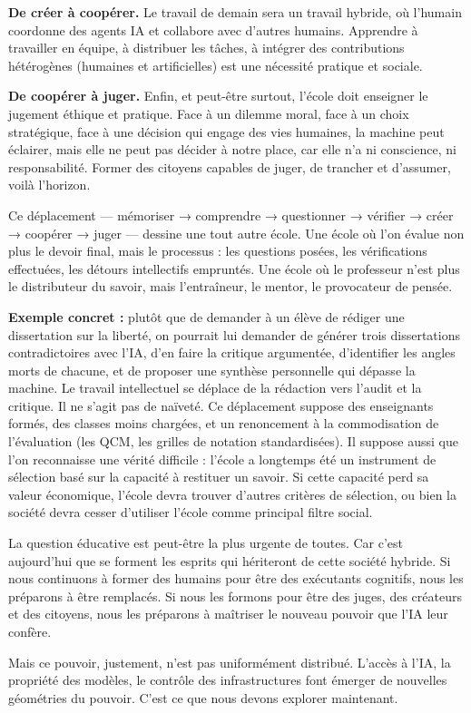 \textbf{De créer à coopérer.} Le travail de demain sera un travail hybride, où l'humain coordonne des agents IA et collabore avec d'autres humains. Apprendre à travailler en équipe, à distribuer les tâches, à intégrer des contributions hétérogènes (humaines et artificielles) est une nécessité pratique et sociale.

\textbf{De coopérer à juger.} Enfin, et peut-être surtout, l'école doit enseigner le jugement éthique et pratique. Face à un dilemme moral, face à un choix stratégique, face à une décision qui engage des vies humaines, la machine peut éclairer, mais elle ne peut pas décider à notre place, car elle n'a ni conscience, ni responsabilité. Former des citoyens capables de juger, de trancher et d'assumer, voilà l'horizon.

Ce déplacement — mémoriser → comprendre → questionner → vérifier → créer → coopérer → juger — dessine une tout autre école. Une école où l'on évalue non plus le devoir final, mais le processus : les questions posées, les vérifications effectuées, les détours intellectifs empruntés. Une école où le professeur n'est plus le distributeur du savoir, mais l'entraîneur, le mentor, le provocateur de pensée.

\textbf{Exemple concret :} plutôt que de demander à un élève de rédiger une dissertation sur la liberté, on pourrait lui demander de générer trois dissertations contradictoires avec l'IA, d'en faire la critique argumentée, d'identifier les angles morts de chacune, et de proposer une synthèse personnelle qui dépasse la machine. Le travail intellectuel se déplace de la rédaction vers l'audit et la critique. Il ne s'agit pas de naïveté. Ce déplacement suppose des enseignants formés, des classes moins chargées, et un renoncement à la commodisation de l'évaluation (les QCM, les grilles de notation standardisées). Il suppose aussi que l'on reconnaisse une vérité difficile : l'école a longtemps été un instrument de sélection basé sur la capacité à restituer un savoir. Si cette capacité perd sa valeur économique, l'école devra trouver d'autres critères de sélection, ou bien la société devra cesser d'utiliser l'école comme principal filtre social.

La question éducative est peut-être la plus urgente de toutes. Car c'est aujourd'hui que se forment les esprits qui hériteront de cette société hybride. Si nous continuons à former des humains pour être des exécutants cognitifs, nous les préparons à être remplacés. Si nous les formons pour être des juges, des créateurs et des citoyens, nous les préparons à maîtriser le nouveau pouvoir que l'IA leur confère.

Mais ce pouvoir, justement, n'est pas uniformément distribué. L'accès à l'IA, la propriété des modèles, le contrôle des infrastructures font émerger de nouvelles géométries du pouvoir. C'est ce que nous devons explorer maintenant.
